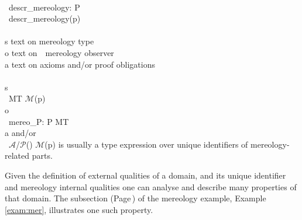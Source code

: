 \label{Calculate Mereologies}

\bp
{} \\
\>\ descr\_mereology: P {\RIGHTARROW} \rsltext\\
\>\ descr\_mereology(p) {\IS}\\
\>\>\>\bq {}\\
\>\>\>\>\>{\LBRACKET}s{\RBRACKET} text on mereology type\\
\>\>\>\>\>{\LBRACKET}o{\RBRACKET} text on\ \ mereology observer\\
\>\>\>\>\>{\LBRACKET}a{\RBRACKET} text on axioms and/or proof obligations\\
\>\>\>\ \,\,\\
\>\>\>\>\>{\LBRACKET}s{\RBRACKET}  \\
\>\>\>\>\>\>\>\>\ MT {\EQ} $\mathcal{M}$(p)\\
\>\>\>\>\>{\LBRACKET}o{\RBRACKET}  \\
\>\>\>\>\>\>\>\>\ mereo\_P: P {\RIGHTARROW} MT\\
\>\>\>\>\>{\LBRACKET}a{\RBRACKET}  and/or \\
\>\>\>\>\>\>\>\>\ $\mathcal{A}$/$\mathcal{P}$({\DOTDOTDOT}) \eq
\ep
\eff
\noindent
\begynd
\pind \textsf{$\mathcal{M}$(p)} is usually a type expression over
      unique identifiers of mereology-related parts.
\afslut


\noindent
\begynd
\pind Given the definition of
\begynd
\pind external qualities of a domain,
\pind and its unique identifier and mereology internal qualities
\pind one can analyse and describe many properties of that domain.
\afslut
\pind The  subsection (Page\,\pageref{exa:Routes}) of the mereology example,
      Example\,\vref{exam:mer}, illustrates one such property.
\afslut


